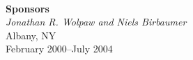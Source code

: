 \begin{titlepage}
\begin{minipage}{\textwidth}
\begin{center}
\begin{minipage}{13cm}
\begin{minipage}[c]{3cm}
  \end{minipage}
\end{minipage}
%
\\[0.5cm]
\textbf{Sponsors} \\
\textit{Jonathan R. Wolpaw and Niels Birbaumer}
\\[1.0cm]
{Albany, NY} \\[1ex]
{February 2000--July 2004}
\end{center}
\end{minipage}
\end{titlepage}
